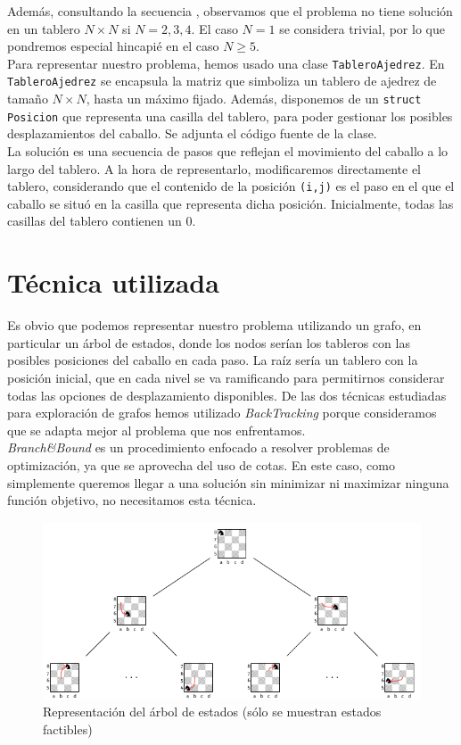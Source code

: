 \documentclass[11pt]{article}
\begin{document}
Además, consultando la secuencia \cite{sequence}, observamos que el problema no tiene solución en un tablero $N\times N$ si $N=2,3,4$. El caso $N=1$ se considera trivial, por lo que pondremos especial hincapié en el caso $N\ge5$.\\

Para representar nuestro problema, hemos usado una clase \verb|TableroAjedrez|. En \verb|TableroAjedrez| se encapsula la matriz que simboliza un tablero de ajedrez de tamaño $N\times N$, hasta un máximo fijado. Además, disponemos de un \verb|struct Posicion| que representa una casilla del tablero, para poder gestionar los posibles desplazamientos del caballo. Se adjunta el código fuente de la clase.\\

La solución es una secuencia de pasos que reflejan el movimiento del caballo a lo largo del tablero. A la hora de representarlo, modificaremos directamente el tablero, considerando que el contenido de la posición \verb|(i,j)| es el paso en el que el caballo se situó en la casilla que representa dicha posición. Inicialmente, todas las casillas del tablero contienen un $0$.

\section*{Técnica utilizada}

Es obvio que podemos representar nuestro problema utilizando un grafo, en particular un árbol de estados, donde los nodos serían los tableros con las posibles posiciones del caballo en cada paso. La raíz sería un tablero con la posición inicial, que en cada nivel se va ramificando para permitirnos considerar todas las opciones de desplazamiento disponibles. De las dos técnicas estudiadas para exploración de grafos hemos utilizado \textit{BackTracking} porque consideramos que se adapta mejor al problema que nos enfrentamos.\\

\textit{Branch\&Bound} es un procedimiento enfocado a resolver problemas de optimización, ya que se aprovecha del uso de cotas. En este caso, como simplemente queremos llegar a una solución sin minimizar ni maximizar ninguna función objetivo, no necesitamos esta técnica.


\begin{figure}[h]
  \centering
\includegraphics[scale=1.5]{img/arbol-estados.pdf}
\caption{Representación del árbol de estados (sólo se muestran estados factibles)} \label{fig:árbol}
\end{figure}
\end{document}
